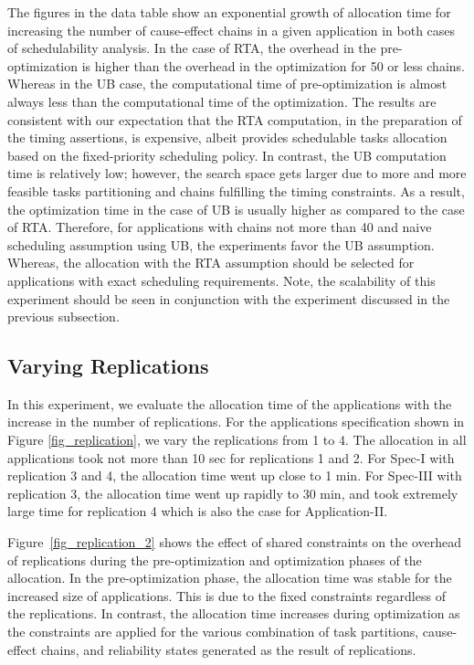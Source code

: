 The figures in the data table show an exponential growth of allocation time for increasing the number of cause-effect chains in a given application in both cases of schedulability analysis. In the case of RTA, the overhead in the pre-optimization is higher than the overhead in the optimization for 50 or less chains. Whereas in the UB case, the computational time of pre-optimization is almost always less than the computational time of the optimization. 
The results are consistent with our expectation that the RTA computation, in the preparation of the timing assertions, is expensive, albeit provides schedulable tasks allocation based on the fixed-priority scheduling policy. In contrast, the UB computation time is relatively low; however, the search space gets larger due to more and more feasible tasks partitioning and chains fulfilling the timing constraints. As a result, the optimization time in the case of UB is usually higher as compared to the case of RTA. Therefore, for applications with chains not more than 40 and naive scheduling assumption using UB, the experiments favor the UB assumption. Whereas, the allocation with the RTA assumption should be selected for applications with exact scheduling requirements. Note, the scalability of this experiment should be seen in conjunction with the experiment discussed in the previous subsection.

\subsection{Varying Replications}
In this experiment, we evaluate the allocation time of the applications with the increase in the number of replications. For the applications specification shown in Figure \ref{fig_replication}, we vary the replications from 1 to 4. 
The allocation in all applications took not more than 10 sec for replications 1 and 2. For Spec-I with replication 3 and 4, the allocation time went up close to 1 min. For Spec-III with replication 3, the allocation time went up rapidly to 30 min, and took extremely large time for replication 4 which is also the case for Application-II.

Figure~\ref{fig_replication_2} shows the effect of shared constraints on the overhead of replications during the pre-optimization and optimization phases of the allocation. In the pre-optimization phase, the allocation time was stable for the increased size of applications. This is due to the fixed constraints regardless of the replications. In contrast, the allocation time increases during optimization as the constraints are applied for the various combination of task partitions, cause-effect chains, and reliability states generated as the result of replications.
